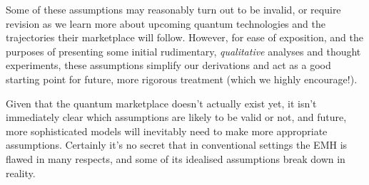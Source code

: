 Some of these assumptions may reasonably turn out to be invalid, or require revision as we learn more about upcoming quantum technologies and the trajectories their marketplace will follow. However, for ease of exposition, and the purposes of presenting some initial rudimentary, \textit{qualitative} analyses and thought experiments, these assumptions simplify our derivations and act as a good starting point for future, more rigorous treatment (which we highly encourage!).

Given that the quantum marketplace doesn't actually exist yet, it isn't immediately clear which assumptions are likely to be valid or not, and future, more sophisticated models will inevitably need to make more appropriate assumptions. Certainly it's no secret that in conventional settings the EMH is flawed in many respects, and some of its idealised assumptions break down in reality.

